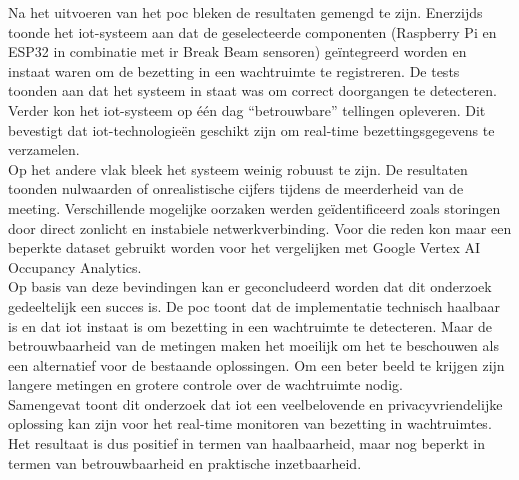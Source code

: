 Na het uitvoeren van het \gls{poc} bleken de resultaten gemengd te zijn. Enerzijds toonde het \gls{iot}-systeem aan dat de geselecteerde componenten (Raspberry Pi en ESP32 in combinatie met \gls{ir} Break Beam sensoren) geïntegreerd worden en instaat waren om de bezetting in een wachtruimte te registreren. De tests toonden aan dat het systeem in staat was om correct doorgangen te detecteren. Verder kon het \gls{iot}-systeem op één dag “betrouwbare” tellingen opleveren. Dit bevestigt dat \gls{iot}-technologieën geschikt zijn om real-time bezettingsgegevens te verzamelen. \\

Op het andere vlak bleek het systeem weinig robuust te zijn. De resultaten toonden nulwaarden of onrealistische cijfers tijdens de meerderheid van de meeting. Verschillende mogelijke oorzaken werden geïdentificeerd zoals storingen door direct zonlicht en instabiele netwerkverbinding. Voor die reden kon maar een beperkte dataset gebruikt worden voor het vergelijken met Google Vertex AI Occupancy Analytics. \\

Op basis van deze bevindingen kan er geconcludeerd worden dat dit onderzoek gedeeltelijk een succes is. De \gls{poc} toont dat de implementatie technisch haalbaar is en dat \gls{iot} instaat is om bezetting in een wachtruimte te detecteren. Maar de betrouwbaarheid van de metingen maken het moeilijk om het te beschouwen als een alternatief voor de bestaande oplossingen. Om een beter beeld te krijgen zijn langere metingen en grotere controle over de wachtruimte nodig. \\

Samengevat toont dit onderzoek dat \gls{iot} een veelbelovende en privacyvriendelijke oplossing kan zijn voor het real-time monitoren van bezetting in wachtruimtes. Het resultaat is dus positief in termen van haalbaarheid, maar nog beperkt in termen van betrouwbaarheid en praktische inzetbaarheid.




